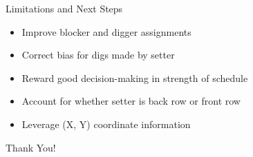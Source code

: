 \documentclass[handout]{beamer}
\begin{document}
\begin{frame}{Limitations and Next Steps}
  \begin{itemize}
    \item Improve blocker and digger assignments
    \item Correct bias for digs made by setter
    \item Reward good decision-making in strength of schedule
    \item Account for whether setter is back row or front row
    \item Leverage (X, Y) coordinate information
  \end{itemize}
\end{frame}

\begin{frame}
  \centering
  \LARGE
  Thank You!
\end{frame}
\end{document}

